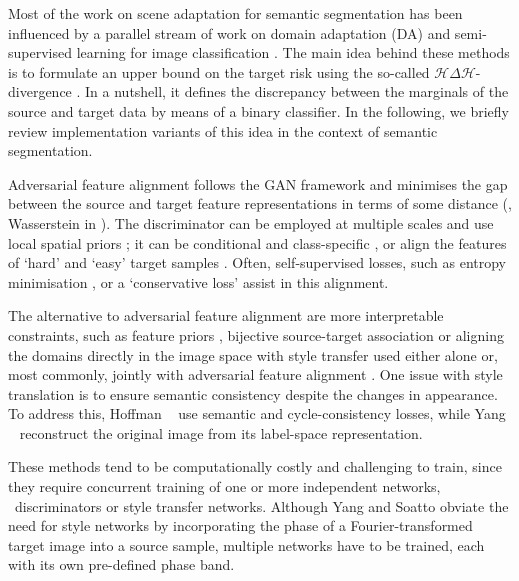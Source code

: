 
Most of the work on scene adaptation for semantic segmentation has been influenced by a parallel stream of work on domain adaptation (DA) and semi-supervised learning for image classification \cite{FrenchMF18,ganin2016domain,GrandvaletB04,LiWSHL18,LongC0J18}.
The main idea behind these methods is to formulate an upper bound on the target risk using the so-called $\mathcal{H} \Delta \mathcal{H}$-divergence \cite{Ben-DavidBCKPV10}.
In a nutshell, it defines the discrepancy between the marginals of the source and target data by means of a binary classifier.
In the following, we briefly review implementation variants of this idea in the context of semantic segmentation.


Adversarial feature alignment follows the GAN framework \cite{ganin2016domain,NIPS2014_5423} and minimises the gap between the source and target feature representations in terms of some distance (\eg, Wasserstein in \cite{LeeBBU19}).
The discriminator can be employed at multiple scales \cite{Chen0G18,TsaiHSS0C18,Yang_2020_ECCV} and use local spatial priors \cite{ZhangQYNL020};
it can be conditional \cite{HongWYY18} and class-specific \cite{DuTYFXZYZ19,Luo0GYY19},
or align the features of `hard' and `easy' target samples \cite{PanSRLK20}.
Often, self-supervised losses, such as entropy minimisation \cite{VuJBCP19}, or a `conservative loss' \cite{zhu2018penalizing} assist in this alignment.

The alternative to adversarial feature alignment are more interpretable constraints, such as feature priors \cite{luo2019significance}, bijective source-target association \cite{KangW0ZH20} or aligning the domains directly in the image space with style transfer \cite{CycleGAN2017} used either alone \cite{WuHLUGLD18} or, most commonly, jointly with adversarial feature alignment \cite{ChangWPC19,ChenL0H19,GongLCG19,MustoZ20,Yang_2021_WACV,YangLSS20,ZhangQY0M18}.
One issue with style translation is to ensure semantic consistency despite the changes in appearance.
To address this, Hoffman \etal~\cite{HoffmanTPZISED18} use semantic and cycle-consistency losses, while Yang \etal~\cite{Yang_2020_ECCV} reconstruct the original image from its label-space representation.

These methods tend to be computationally costly and challenging to train, since they require concurrent training of one or more independent networks, \eg~discriminators or style transfer networks.
Although Yang and Soatto \cite{0001S20} obviate the need for style networks by incorporating the phase of a Fourier-transformed target image into a source sample, multiple networks have to be trained, each with its own pre-defined phase band.

